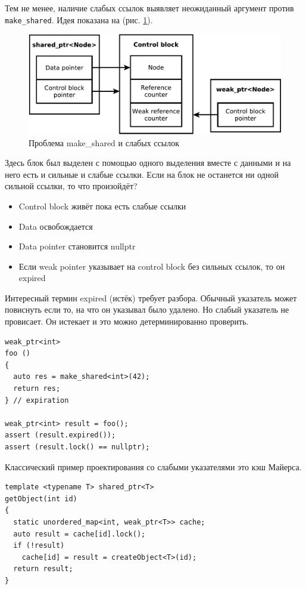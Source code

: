 \documentclass[a4paper,12pt,oneside]{article}
\begin{document}
Тем не менее, наличие слабых ссылок выявляет неожиданный аргумент против \lstinline!make_shared!. Идея показана на (рис. \ref{fig:smartptrs-weak-inner}).

\begin{figure}[ht]
\centering
\includegraphics[width=1.0\textwidth]{illustrations/smartptrs-weak-inner-crop.pdf}
\caption{Проблема make\_shared и слабых ссылок}
\label{fig:smartptrs-weak-inner}
\end{figure}

Здесь блок был выделен с помощью одного выделения вместе с данными и на него есть и сильные и слабые ссылки. Если на блок не останется ни одной сильной ссылки, то что произойдёт?

\begin{itemize} 
\item Control block живёт пока есть слабые ссылки
\item Data освобождается
\item Data pointer становится nullptr
\item Если weak pointer указывает на control block без сильных ссылок, то он expired
\end{itemize} 

Интересный термин expired (истёк) требует разбора. Обычный указатель может повиснуть если то, на что он указывал было удалено. Но слабый указатель не провисает. Он истекает и это можно детерминированно проверить.

\begin{lstlisting}
weak_ptr<int> 
foo () 
{
  auto res = make_shared<int>(42);
  return res;
} // expiration

weak_ptr<int> result = foo();
assert (result.expired());
assert (result.lock() == nullptr);
\end{lstlisting}

Классический пример проектирования со слабыми указателями это кэш Майерса.

\begin{lstlisting}
template <typename T> shared_ptr<T> 
getObject(int id) 
{
  static unordered_map<int, weak_ptr<T>> cache;
  auto result = cache[id].lock();
  if (!result) 
    cache[id] = result = createObject<T>(id); 
  return result;
}
\end{lstlisting}
\end{document}
